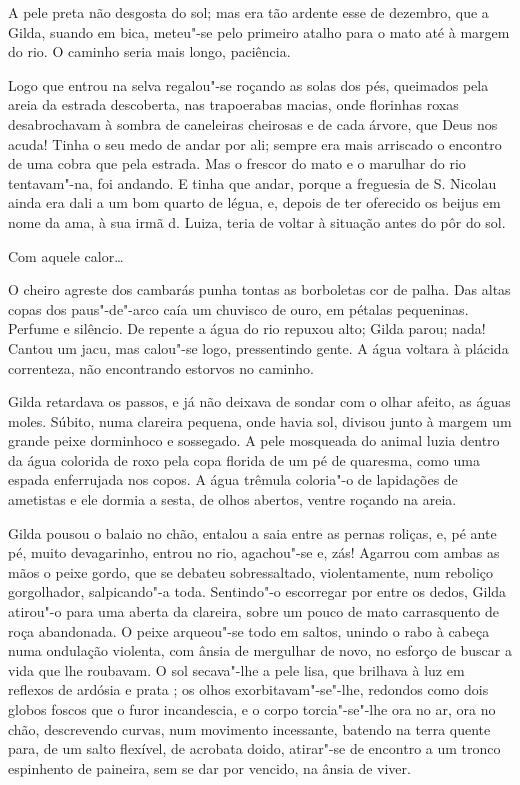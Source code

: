 A pele preta não desgosta do sol; mas era tão ardente esse de dezembro,
que a Gilda, suando em bica, meteu"-se pelo primeiro atalho para o mato
até à margem do rio. O caminho seria mais longo, paciência.

Logo que entrou na selva regalou"-se roçando as solas dos pés, queimados
pela areia da estrada descoberta, nas trapoerabas macias, onde florinhas
roxas desabrochavam à sombra de caneleiras cheirosas e de cada árvore,
que Deus nos acuda! Tinha o seu medo de andar por ali; sempre era mais
arriscado o encontro de uma cobra que pela estrada. Mas o frescor do
mato e o marulhar do rio tentavam"-na, foi andando. E tinha que andar,
porque a freguesia de S. Nicolau ainda era dali a um bom quarto de
légua, e, depois de ter oferecido os beijus em nome da ama, à sua irmã
d. Luiza, teria de voltar à situação antes do pôr do sol.

Com aquele calor\ldots{}

O cheiro agreste dos cambarás punha tontas as borboletas cor de palha.
Das altas copas dos paus"-de"-arco caía um chuvisco de ouro, em pétalas
pequeninas. Perfume e silêncio. De repente a água do rio repuxou alto;
Gilda parou; nada! Cantou um jacu, mas calou"-se logo, pressentindo
gente. A água voltara à plácida correnteza, não encontrando estorvos no
caminho.

Gilda retardava os passos, e já não deixava de sondar com o olhar
afeito, as águas moles. Súbito, numa clareira pequena, onde havia sol,
divisou junto à margem um grande peixe dorminhoco e sossegado. A pele
mosqueada do animal luzia dentro da água colorida de roxo pela copa
florida de um pé de quaresma, como uma espada enferrujada nos copos. A
água trêmula coloria"-o de lapidações de ametistas e ele dormia a sesta,
de olhos abertos, ventre roçando na areia.

Gilda pousou o balaio no chão, entalou a saia entre as pernas roliças,
e, pé ante pé, muito devagarinho, entrou no rio, agachou"-se e, zás!
Agarrou com ambas as mãos o peixe gordo, que se debateu sobressaltado,
violentamente, num reboliço gorgolhador, salpicando"-a toda. Sentindo"-o
escorregar por entre os dedos, Gilda atirou"-o para uma aberta da
clareira, sobre um pouco de mato carrasquento de roça abandonada. O
peixe arqueou"-se todo em saltos, unindo o rabo à cabeça numa ondulação
violenta, com ânsia de mergulhar de novo, no esforço de buscar a vida
que lhe roubavam. O sol secava"-lhe a pele lisa, que brilhava à luz em
reflexos de ardósia e prata ; os olhos exorbitavam"-se"-lhe, redondos como
dois globos foscos que o furor incandescia, e o corpo torcia"-se"-lhe ora
no ar, ora no chão, descrevendo curvas, num movimento incessante,
batendo na terra quente para, de um salto flexível, de acrobata doido,
atirar"-se de encontro a um tronco espinhento de paineira, sem se dar por
vencido, na ânsia de viver.

